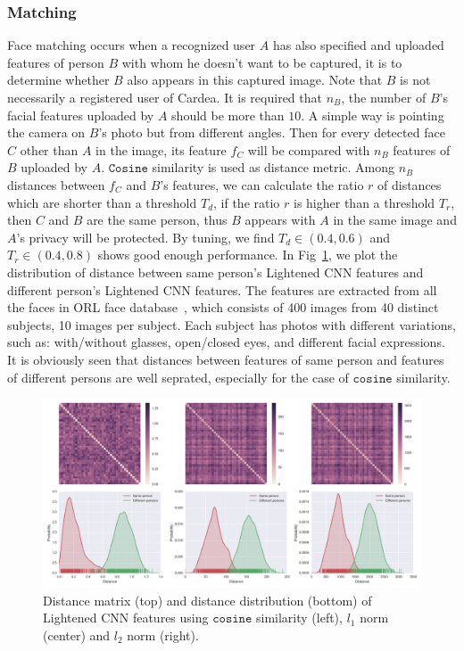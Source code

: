 \subsubsection{Matching}
Face matching occurs when a recognized user $A$ has also specified and uploaded features of person $B$ with whom he doesn't want to be captured, it is to determine whether $B$ also appears in this captured image. Note that $B$ is not necessarily a registered user of Cardea. It is required that $n_B$, the number of $B$'s facial features uploaded by $A$ should be more than $10$. A simple way is pointing the camera on $B$'s photo but from different angles. Then for every detected face $C$ other than $A$ in the image, its feature $f_C$ will be compared with $n_B$ features of $B$ uploaded by $A$. $\mathtt{Cosine}$ similarity is used as distance metric. Among $n_B$ distances between $f_C$ and $B$'s features, we can calculate the ratio $r$ of distances which are shorter than a threshold $T_d$, if the ratio $r$ is higher than a threshold $T_r$, then $C$ and $B$ are the same person, thus $B$ appears with $A$ in the same image and $A$'s privacy will be protected. By tuning, we find $T_d \in (0.4, 0.6)$ and $T_r \in (0.4, 0.8) $ shows good enough performance. In Fig~\ref{fig:ch4-mfmsim}, we plot the distribution of distance between same person's Lightened CNN features and different person's Lightened CNN features. The features are extracted from all the faces in ORL face database~\cite{links:orlfacedb}, which consists of 400 images from 40 distinct subjects, 10 images per subject. Each subject has photos with different variations, such as: with/without glasses, open/closed eyes, and different facial expressions. It is obviously seen that distances between features of same person and features of different persons are well seprated, especially for the case of $\mathtt{cosine}$ similarity.

\begin{figure}[!htbp]
    \centering
    \includegraphics[width=1.0\textwidth]{figure/ch4-mfmsim.png}
    \caption{Distance matrix (top) and distance distribution (bottom) of Lightened CNN features using $\mathtt{cosine}$ similarity (left), $l_1$ norm (center) and $l_2$ norm (right).}
    \label{fig:ch4-mfmsim}
\end{figure}


